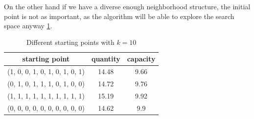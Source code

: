 On the other hand if we have a diverse enough neighborhood structure, the initial point is not as important, as the algorithm will be able to explore the search space anyway \ref{tab:start}.
\begin{table}[H]
    \centering
    \begin{tabular}{c||c |c}
        starting point                 & quantity & capacity \\ \hline
        (1, 0, 0, 1, 0, 1, 0, 1, 0, 1) & 14.48    & 9.66     \\
        (0, 1, 0, 1, 1, 1, 0, 1, 0, 0) & 14.72    & 9.76     \\
        (1, 1, 1, 1, 1, 1, 1, 1, 1, 1) & 15.19    & 9.92     \\
        (0, 0, 0, 0, 0, 0, 0, 0, 0, 0) & 14.62    & 9.9      \\
    \end{tabular}
    \caption{Different starting points with $k=10$}
    \label{tab:start}
\end{table}


